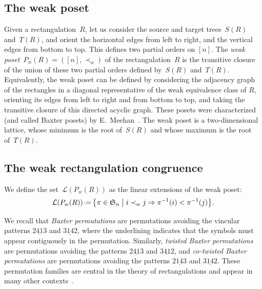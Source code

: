 \documentclass{amsart}
\theoremstyle{definition}
\newcommand{\f}[1]{\mathfrak{#1}} %
\newcommand{\bigset}[2]{\big\{ #1 \;\big|\; #2 \big\}} %
\newcommand{\eqdef}{\mbox{\,\raisebox{0.2ex}{\scriptsize\ensuremath{\mathrm:}}\ensuremath{=}\,}} %
\renewcommand{\implies}{\Rightarrow} %
\newcommand{\darkblue}{\color{darkblue}} %
\newcommand{\defn}[1]{\textsl{\darkblue #1}} %
\begin{document}

\subsection{The weak poset}
\label{subsec:weakPoset}

Given a rectangulation~$R$, let us consider the source and target trees~$S(R)$ and~$T(R)$, and orient the horizontal edges from left to right, and the vertical edges from bottom to top.
This defines two partial orders on $[n]$.
The \defn{weak poset}~$P_w(R)=([n],\prec_w)$ of the rectangulation~$R$ is the transitive closure of the union of these two partial orders defined by~$S(R)$ and~$T(R)$.
Equivalently, the weak poset can be defined by considering the adjacency graph of the rectangles in a diagonal representative of the weak equivalence class of $R$, orienting its edges from left to right and from bottom to top, and taking the transitive closure of this directed acyclic graph.
These posets were characterized (and called Baxter posets) by E.~Meehan~\cite{MR4014603}.
The weak poset is a two-dimensional lattice, whose minimum is the root of~$S(R)$ and whose maximum is the root of~$T(R)$.


\subsection{The weak rectangulation congruence}
\label{subsec:weakRectangulationCongruence}

We define the set~$\mathcal{L}(P_w(R))$ as the linear extensions of the weak poset:
\[
\mathcal{L}(P_w(R)) \eqdef \bigset{\pi\in\f{S}_n }{ i\prec_w j\implies \pi^{-1}(i) < \pi^{-1}(j)}.
\]

We recall that \defn{Baxter permutations} are permutations avoiding the vincular patterns $2\underline{41}3$ and $3\underline{14}2$, where the underlining indicates that the symbols must appear contiguously in the permutation.
Similarly, \defn{twisted Baxter permutations} are permutations avoiding the patterns $2\underline{41}3$ and $3\underline{41}2$, and \defn{co-twisted Baxter permutations} are permutations avoiding the patterns $2\underline{14}3$ and $3\underline{14}2$.
These permutation families are central in the theory of rectangulations and appear in many other contexts~\cite{MR2763051}.
\end{document}
